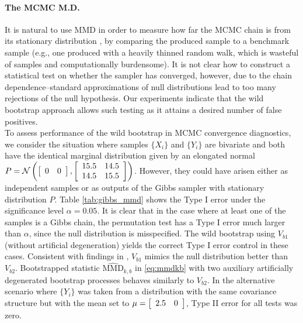 \paragraph{The MCMC M.D.}
It is natural to use MMD in order to measure how far the MCMC chain is from its stationary distribution \cite[Section 5]{sejdinovic_KAMH}, 
by comparing the produced sample to a benchmark sample (e.g., one produced with a heavily thinned random walk, which is wasteful of samples and computationally burdensome). It is not clear how to construct a statistical test on whether the sampler has converged, however, due to the chain dependence--standard approximations of null distributions lead to too many rejections of the null hypothesis.
Our experiments indicate that the wild bootstrap approach allows such testing as it attains a desired number of false positives.\\
To assess performance of the wild bootstrap in MCMC convergence diagnostics, we consider the situation where samples $\{X_i\}$ and $\{Y_i\}$ are bivariate and both have the identical marginal distribution given by an elongated normal
$P=\mathcal{N}\left(\left[\protect\begin{array}{cc}
0 & 0\protect\end{array}\right],\left[\protect\begin{array}{cc}
15.5 & 14.5\protect\\
14.5 & 15.5
\protect\end{array}\right]\right)$.
However, they could have arisen either as independent samples or as outputs of the Gibbs sampler with stationary distribution $P$. 
Table \ref{tab:gibbs_mmd} shows the Type I error under the significance level $\alpha=0.05$. It is clear that in the case where at least one of the samples is a Gibbs chain, the permutation test has a Type I error much larger than $\alpha$, since the null distribution is misspecified. 
The wild bootstrap using $V_{b1}$ (without artificial degeneration) yields the correct Type I error control in these cases. Consistent with findings in \cite[Section 5]{leucht_dependent_2013}, $V_{b1}$ mimics the null distribution better than $V_{b2}$. Bootstrapped statistic $\widehat{\text{MMD}}_{k,b}$ in \eqref{eq:mmdkb} with two auxiliary artificially degenerated bootstrap processes behaves similarly to $V_{b2}$.
In the alternative scenario where $\{Y_i\}$ was taken from a distribution with the same covariance structure but with the mean set to $\mu= \left[\protect\begin{array}{cc}
2.5 & 0\protect\end{array}\right]$, Type II error for all tests was zero.
\vspace{-0.2cm}
